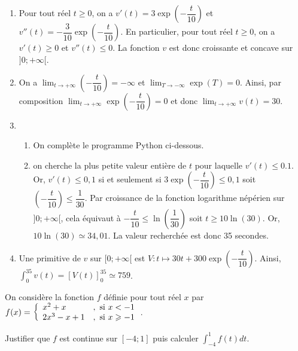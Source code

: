 \documentclass[11pt,fleqn, openany]{book} %
\begin{document}
\begin{solution}
\begin{enumerate}
\item Pour tout réel $t\geqslant 0$, on a $v'(t)=3\exp\left(-\dfrac{t}{10}\right)$ et $v''(t)=-\dfrac{3}{10}\exp\left(-\dfrac{t}{10}\right)$. En particulier, pour tout réel $t\geqslant 0$, on a $v'(t)\geqslant 0$ et $v''(t)\leqslant 0$. La fonction $v$ est donc croissante et concave sur $]0;+\infty[$.
\item On a $\displaystyle\lim_{t \to +\infty}\left(-\dfrac{t}{10}\right)=-\infty$ et $\displaystyle\lim_{T \to -\infty}\exp(T)=0$. Ainsi, par composition $\displaystyle\lim_{t\to +\infty}\exp\left(-\dfrac{t}{10}\right)=0$ et donc $\displaystyle\lim_{t\to +\infty}v(t)=30$.
\item 
\begin{enumerate}
\item On complète le programme Python ci-dessous.

\item on cherche la plus petite valeur entière de $t$ pour laquelle  $v'(t) \leqslant 0.1$. Or, $v'(t)\leqslant 0,1$ si et seulement si $3\exp\left(-\dfrac{t}{10}\right) \leqslant 0,1$ soit $\left(-\dfrac{t}{10}\right) \leqslant \dfrac{1}{30}$. Par croissance de la fonction logarithme népérien sur $]0;+\infty[$, cela équivaut à $-\dfrac{t}{10}\leqslant \ln\left(\dfrac{1}{30}\right)$ soit $t \geqslant 10\ln(30)$. Or, $10\ln(30) \simeq 34,01$. La valeur recherchée est donc 35 secondes.

\end{enumerate}
\item Une primitive de $v$ sur $[0;+\infty[$ est $V:t\mapsto 30t+300\exp\left(-\dfrac{t}{10}\right)$. Ainsi, $\displaystyle\int_0^{35}v(t)=[V(t)]_0^{35}\simeq 759$.
\end{enumerate}

\end{solution}

 
\begin{exercise}[topic=int02]On considère la fonction $f$ définie pour tout réel $x$ par $f(x)=\left\{\renewcommand{\arraystretch}{1}\begin{array}{ll} x^2+x&,\text{ si }x<-1\\ 2x^3-x+1&,\text{ si }x\geqslant -1\end{array}\right.$.

 Justifier que $f$ est continue sur $[-4;1]$ puis calculer $\displaystyle\int_{-4}^1 f(t)dt$.\end{exercise}
\end{document}
